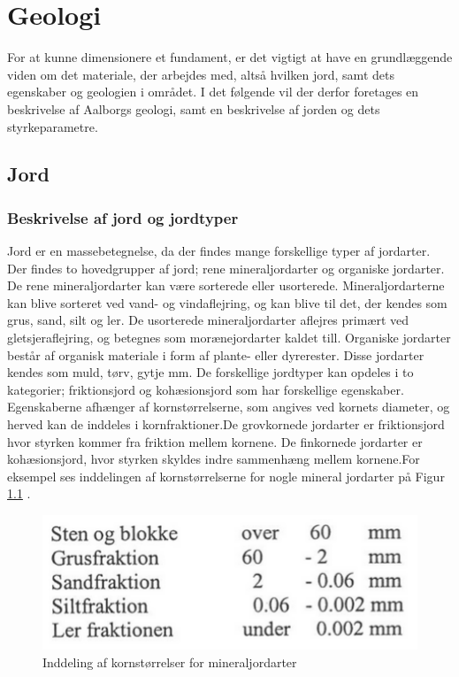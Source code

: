 \chapter{Geologi}
For at kunne dimensionere et fundament, er det vigtigt at have en grundlæggende viden om det materiale, der arbejdes med, altså hvilken jord, samt dets egenskaber og geologien i området. I det følgende vil der derfor foretages en beskrivelse af Aalborgs geologi, samt en beskrivelse af jorden og dets styrkeparametre.

\section{Jord}
\subsection{Beskrivelse af jord og jordtyper}
Jord er en massebetegnelse, da der findes mange forskellige typer af jordarter. Der findes to hovedgrupper af jord; rene mineraljordarter og organiske jordarter. 
\newline \indent{     }  De rene mineraljordarter kan være sorterede eller usorterede. Mineraljordarterne kan blive sorteret ved vand- og vindaflejring, og kan blive til det, der kendes som grus, sand, silt og ler. De usorterede mineraljordarter aflejres primært ved gletsjeraflejring, og betegnes som morænejordarter kaldet till.\citep{jordarter}
\newline \indent{     }  Organiske jordarter består af organisk materiale i form af plante- eller dyrerester. Disse jordarter kendes som muld, tørv, gytje mm.\citep{miljo}
\newline \indent{     } De forskellige jordtyper kan opdeles i to kategorier; friktionsjord og kohæsionsjord som har forskellige egenskaber. Egenskaberne afhænger af kornstørrelserne, som angives ved kornets diameter, og herved kan de inddeles i kornfraktioner\citep{geoteknik}.De grovkornede jordarter er friktionsjord hvor styrken kommer fra friktion mellem kornene. De finkornede jordarter er kohæsionsjord, hvor styrken skyldes indre sammenhæng mellem kornene.For eksempel ses inddelingen af kornstørrelserne for nogle mineral jordarter på Figur \ref{fig:kornstorrelser} .

\begin{figure}[htbp]	\centering
	\begin{minipage}[b]{0.48\textwidth}
		\includegraphics[width=1.0\textwidth]{billeder/kornetsdiameter.png}
		\caption{Inddeling af kornstørrelser for mineraljordarter \citep{jordarter}}
		\label{fig:kornstorrelser}
	\end{minipage}\hfill
\end{figure}

